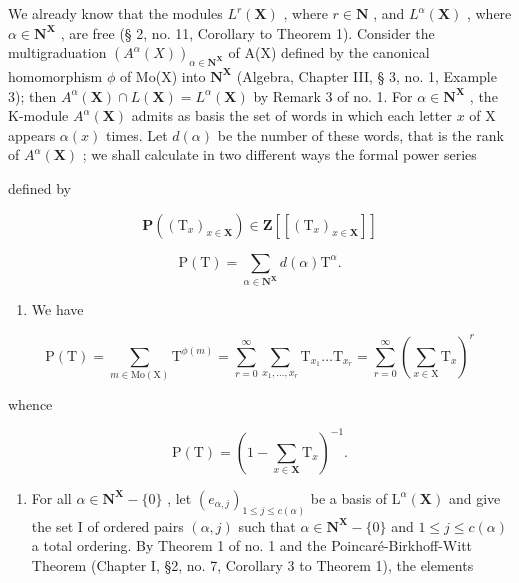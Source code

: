 We already know that the modules \(L^{r}(\mathbf{X})\) , where \(r \in \mathbf{N}\) , and \(L^{\alpha}(\mathbf{X})\) , where \(\alpha \in \mathbf{N}^{\mathbf{X}}\) , are free (§ 2, no. 11, Corollary to Theorem 1). Consider the multigraduation \((A^{\alpha}(X))_{\alpha \in \mathbf{N}^{\mathbf{X}}}\) of A(X) defined by the canonical homomorphism \(\phi\) of Mo(X) into \(\mathbf{N}^{\mathbf{X}}\) (Algebra, Chapter III, § 3, no. 1, Example 3); then \(A^{\alpha}(\mathbf{X}) \cap L(\mathbf{X}) = L^{\alpha}(\mathbf{X})\) by Remark 3 of no. 1. For \(\alpha \in \mathbf{N}^{\mathbf{X}}\) , the K-module \(A^{\alpha}(\mathbf{X})\) admits as basis the set of words in which each letter \(x\) of X appears \(\alpha(x)\) times. Let \(d(\alpha)\) be the number of these words, that is the rank of \(A^{\alpha}(\mathbf{X})\) ; we shall calculate in two different ways the formal power series

defined by

\[
\mathbf {P} ((\mathrm{T} _ {x}) _ {x \in \mathbf {X}}) \in \mathbf {Z} [ [ (\mathrm{T} _ {x}) _ {x \in \mathbf {X}} ] ]\tag{17}
\]

\[
\mathrm{P} (\mathrm{T}) = \sum_ {\alpha \in \mathbf {N} ^ {\mathbf {X}}} d (\alpha) \mathrm{T} ^ {\alpha}.
\]

\begin{enumerate}
\def\labelenumi{(\arabic{enumi})}
\tightlist
\item
  We have
\end{enumerate}

\[
\mathrm{P} (\mathrm{T}) = \sum_ {m \in \mathrm{Mo} (\mathrm{X})} \mathrm{T} ^ {\phi (m)} = \sum_ {r = 0} ^ {\infty} \sum_ {x _ {1}, \dots , x _ {r}} \mathrm{T} _ {x _ {1}} \dots \mathrm{T} _ {x _ {r}} = \sum_ {r = 0} ^ {\infty} \left(\sum_ {x \in \mathrm{X}} \mathrm{T} _ {x}\right) ^ {r}
\]

whence

\[
\mathrm{P} (\mathrm{T}) = \left(1 - \sum_ {x \in \mathbf {X}} \mathrm{T} _ {x}\right) ^ {- 1}.\tag{18}
\]

\begin{enumerate}
\def\labelenumi{(\arabic{enumi})}
\setcounter{enumi}{1}
\tightlist
\item
  For all \(\alpha \in \mathbf{N}^{\mathbf{X}} - \{0\}\) , let \((e_{\alpha,j})_{1 \leqslant j \leqslant c(\alpha)}\) be a basis of \(\mathrm{L}^{\alpha}(\mathbf{X})\) and give the set I of ordered pairs \((\alpha, j)\) such that \(\alpha \in \mathbf{N}^{\mathbf{X}} - \{0\}\) and \(1 \leqslant j \leqslant c(\alpha)\) a total ordering. By Theorem 1 of no. 1 and the Poincaré-Birkhoff-Witt Theorem (Chapter I, §2, no. 7, Corollary 3 to Theorem 1), the elements
\end{enumerate}

